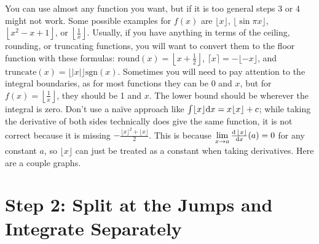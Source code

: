 \documentclass[12pt]{article}
\begin{document}
	\indent\indent You can use almost any function you want, but if it is too general steps 3 or 4 might not
	work. Some possible examples for $f(x)$ are $\lfloor x\rfloor$, $\lfloor\sin\pi x\rfloor$,
	$\left\lfloor x^2 - x + 1\right\rfloor$, or $\left\lfloor\frac 1x\right\rfloor$. Usually, if you have
	anything in terms of the ceiling, rounding, or truncating functions, you will want to convert them to the
	floor function with these formulas: $\text{round}(x)=\left\lfloor x+\frac12\right\rfloor$,
	$\lceil x\rceil=-\lfloor-x\rfloor$, and $\text{truncate}(x)=\lfloor|x|\rfloor\text{sgn}(x)$. Sometimes you
	will need to pay attention to the integral boundaries, as for most functions they can be 0 and $x$, but for
	$f(x)=\left\lfloor\frac 1x\right\rfloor$, they should be 1 and $x$. The lower bound should be wherever the
	integral is zero. Don't use a naïve approach like $\int\lfloor x\rfloor\text dx=x\lfloor x\rfloor+c$; while
	taking the derivative of both sides technically does give the same function, it is not correct because it is
	missing $-\frac{\lfloor x\rfloor^2+\lfloor x\rfloor}2$. This is because
	$\displaystyle\lim_{x\to a}\tfrac{\text d\,\lfloor x\rfloor}{\text dx}(a)=0$ for any constant $a$, so
	$\lfloor x\rfloor$ can just be treated as a constant when taking derivatives. Here are a couple graphs.

	\begin{figure}[h]
		\centering
		\hfill
	\end{figure}

\section*{Step 2: Split at the Jumps and Integrate Separately}
\end{document}
